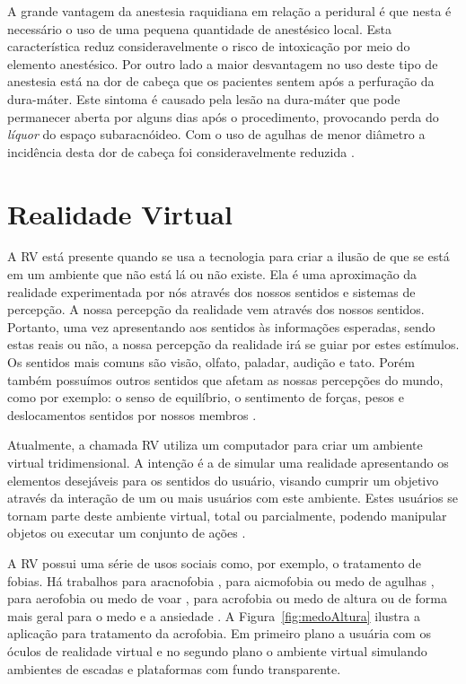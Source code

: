 A grande vantagem da anestesia raquidiana em relação a peridural é que nesta é necessário o uso de uma pequena quantidade de anestésico local. Esta característica reduz consideravelmente o risco de intoxicação por meio do elemento anestésico. Por outro lado a maior desvantagem no uso deste tipo de anestesia está na dor de cabeça que os pacientes sentem após a perfuração da dura-máter. Este sintoma é causado pela lesão na dura-máter que pode permanecer aberta por alguns dias após o procedimento, provocando perda do \textit{líquor} do espaço subaracnóideo. Com o uso de agulhas de menor diâmetro a incidência desta dor de cabeça foi consideravelmente reduzida \cite{INFOESCOLA2018}. 

\section{Realidade Virtual}

A \acrlong{RV} está presente quando se usa a tecnologia para criar a ilusão de que se está em um ambiente que não está lá ou não existe. Ela é uma aproximação da realidade experimentada por nós através dos nossos sentidos e sistemas de percepção. A nossa percepção da realidade vem através dos nossos sentidos. Portanto, uma vez apresentando aos sentidos às informações esperadas, sendo estas reais ou não, a nossa percepção da realidade irá se guiar por estes estímulos. Os sentidos mais comuns são visão, olfato, paladar, audição e tato. Porém também possuímos outros sentidos que afetam as nossas percepções do mundo, como por exemplo: o senso de equilíbrio, o sentimento de forças, pesos e deslocamentos sentidos por nossos membros \cite{VRS2018}.

Atualmente, a chamada \acrfull{RV} utiliza um computador para criar um ambiente virtual tridimensional. A intenção é a de simular uma realidade apresentando os elementos desejáveis para os sentidos do usuário, visando cumprir um objetivo através da interação de um ou mais usuários com este ambiente. Estes usuários se tornam parte deste ambiente virtual, total ou parcialmente, podendo manipular objetos ou executar um conjunto de ações \cite{VRS2018}.

A \acrshort{RV} possui uma série de usos sociais como, por exemplo, o tratamento de fobias. Há trabalhos para aracnofobia \cite{Carlin1997}, para aicmofobia ou medo de agulhas \cite{Galoustian2018}, para aerofobia ou medo de voar \cite{Rothbaum2006}, para acrofobia ou medo de altura \cite{Edwards2018} ou de forma mais geral para o medo e a ansiedade \cite{Goldman2017}. A Figura~\ref{fig:medoAltura} ilustra a aplicação para tratamento da acrofobia. Em primeiro plano a usuária com os óculos de realidade virtual e no segundo plano o ambiente virtual simulando ambientes de escadas e plataformas com fundo transparente.

